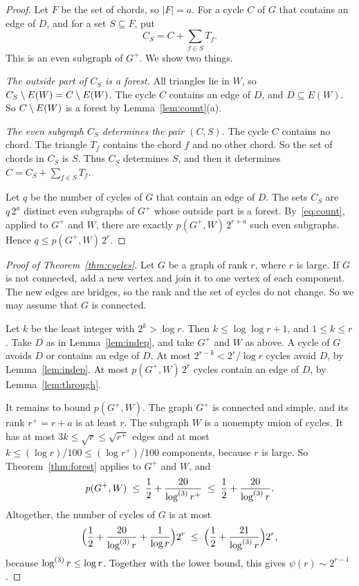 \begin{proof}
Let $F$ be the set of chords, so $|F|=a$. For a cycle $C$ of $G$ that contains an edge of $D$, and
for a set $S\subseteq F$, put
\[
  C_S=C+\sum_{f\in S}T_f .
\]
This is an even subgraph of $G^{+}$. We show two things.

\emph{The outside part of $C_S$ is a forest.} All triangles lie in $W$, so
$C_S\setminus E(W)=C\setminus E(W)$. The cycle $C$ contains an edge of $D$, and $D\subseteq E(W)$. So
$C\setminus E(W)$ is a forest by Lemma~\ref{lem:count}(a).

\emph{The even subgraph $C_S$ determines the pair $(C,S)$.} The cycle $C$ contains no chord. The
triangle $T_f$ contains the chord $f$ and no other chord. So the set of chords in $C_S$ is $S$. Thus
$C_S$ determines $S$, and then it determines $C=C_S+\sum_{f\in S}T_f$.

Let $q$ be the number of cycles of $G$ that contain an edge of $D$. The sets $C_S$ are $q\,2^{a}$
distinct even subgraphs of $G^{+}$ whose outside part is a forest. By~\eqref{eq:count}, applied to
$G^{+}$ and $W$, there are exactly $p(G^{+},W)\,2^{r+a}$ such even subgraphs. Hence
$q\le p(G^{+},W)\,2^{r}$.
\end{proof}

\begin{proof}[Proof of Theorem~\ref{thm:cycles}]
Let $G$ be a graph of rank $r$, where $r$ is large. If $G$ is not connected, add a new vertex and
join it to one vertex of each component. The new edges are bridges, so the rank and the set of
cycles do not change. So we may assume that $G$ is connected.

Let $k$ be the least integer with $2^{k}>\log r$. Then $k\le\log\log r+1$, and $1\le k\le r$. Take
$D$ as in Lemma~\ref{lem:indep}, and take $G^{+}$ and $W$ as above. A cycle of $G$ avoids $D$ or
contains an edge of $D$. At most $2^{r-k}<2^{r}/\log r$ cycles avoid $D$, by
Lemma~\ref{lem:indep}. At most $p(G^{+},W)\,2^{r}$ cycles contain an edge of $D$, by
Lemma~\ref{lem:through}.

It remains to bound $p(G^{+},W)$. The graph $G^{+}$ is connected and simple, and its rank
$r^{+}=r+a$ is at least $r$. The subgraph $W$ is a nonempty union of cycles. It has at most
$3k\le\sqrt{r}\le\sqrt{r^{+}}$ edges and at most $k\le(\log r)/100\le(\log r^{+})/100$ components,
because $r$ is large. So Theorem~\ref{thm:forest} applies to $G^{+}$ and $W$, and
\[
  p(G^{+},W)\;\le\;\frac12+\frac{20}{\log^{(3)}r^{+}}\;\le\;\frac12+\frac{20}{\log^{(3)}r}.
\]
Altogether, the number of cycles of $G$ is at most
\[
  \Bigl(\frac12+\frac{20}{\log^{(3)}r}+\frac1{\log r}\Bigr)2^{r}
  \;\le\;\Bigl(\frac12+\frac{21}{\log^{(3)}r}\Bigr)2^{r},
\]
because $\log^{(3)}r\le\log r$. Together with the lower bound, this gives $\psi(r)\sim2^{r-1}$.
\end{proof}

